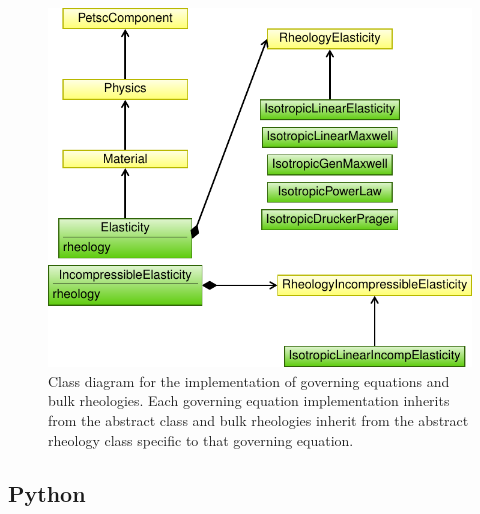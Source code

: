 \begin{figure}[htbp]
  \includegraphics[scale=0.8]{developer/figs/material_classdiagram}
  \caption{Class diagram for the implementation of governing equations
    and bulk rheologies. Each governing equation implementation
    inherits from the abstract  class and bulk
    rheologies inherit from the abstract rheology class specific to
    that governing equation.}
  \label{fig:developer:material:class}
\end{figure}


\subsection{Python}

